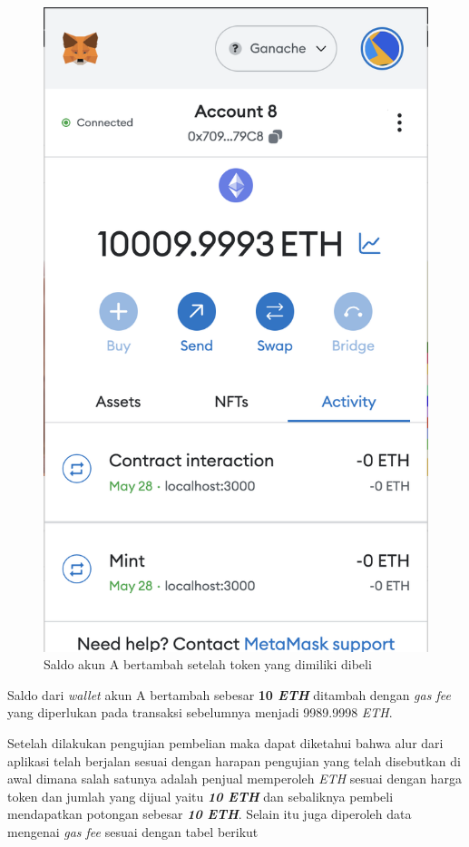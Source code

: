 \begin{itemize}
\begin{figure} [H]
        \includegraphics[scale=0.4]{gambar/img-test-buy-buy-4.png}
        \caption{Saldo akun A bertambah setelah token yang dimiliki dibeli}
        \label{fig:TestBuyHasilPembelian4}
      \end{figure}
    Saldo dari \emph{wallet} akun A bertambah sebesar \textbf{10 \emph{ETH}} ditambah dengan \emph{gas fee} yang diperlukan pada transaksi sebelumnya menjadi 9989.9998 \emph{ETH}. 
\end{itemize}

Setelah dilakukan pengujian pembelian maka dapat diketahui bahwa alur dari aplikasi telah berjalan sesuai dengan harapan pengujian yang telah disebutkan di awal dimana salah satunya adalah penjual memperoleh \emph{ETH} sesuai dengan harga token dan jumlah yang dijual yaitu \emph{\textbf{10 ETH}} dan sebaliknya pembeli mendapatkan potongan sebesar \emph{\textbf{10 ETH}}. Selain itu juga diperoleh data mengenai \emph{gas fee} sesuai dengan tabel berikut

